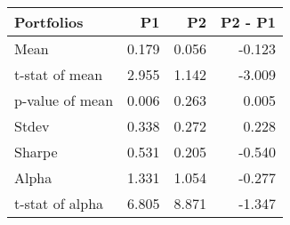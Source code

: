 \begin{tabular}{lrrr}
\toprule
Portfolios & P1 & P2 & P2 - P1 \\
\midrule
Mean & 0.179 & 0.056 & -0.123 \\
t-stat of mean & 2.955 & 1.142 & -3.009 \\
p-value of mean & 0.006 & 0.263 & 0.005 \\
Stdev & 0.338 & 0.272 & 0.228 \\
Sharpe & 0.531 & 0.205 & -0.540 \\
Alpha & 1.331 & 1.054 & -0.277 \\
t-stat of alpha & 6.805 & 8.871 & -1.347 \\
\bottomrule
\end{tabular}
